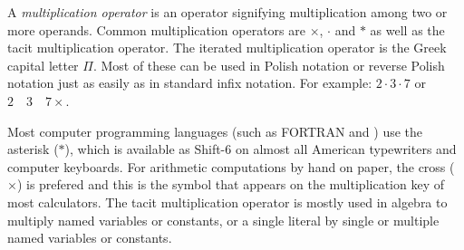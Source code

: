 \documentclass[12pt]{article}
\begin{document}

A {\em multiplication operator} is an operator signifying multiplication among two or more operands. Common multiplication operators are $\times$, $\cdot$ and $\ast$ as well as the tacit multiplication operator. The iterated multiplication operator is the Greek capital letter $\Pi$. Most of these can be used in Polish notation or reverse Polish notation just as easily as in standard infix notation. For example: $2 \cdot 3 \cdot 7$ or $2 \quad 3 \quad 7 \times$.

Most computer programming languages (such as FORTRAN and ) use the asterisk ($\ast$), which is available as Shift-6 on almost all American typewriters and computer keyboards. For arithmetic computations by hand on paper, the cross ($\times$) is prefered and this is the symbol that appears on the multiplication key of most calculators. The tacit multiplication operator is mostly used in algebra to multiply named variables or constants, or a single literal by single or multiple named variables or constants.
\end{document}
